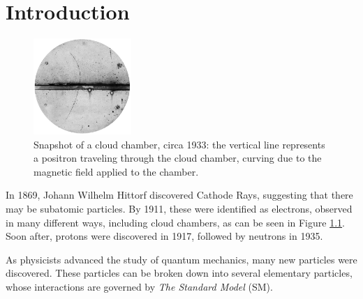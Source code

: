 \chapter{Introduction}\label{Sec:Intro}
\begin{figure}[h]
    \centering
        \includegraphics[width=0.33\textwidth]{F1/Cloud}
        \caption{Snapshot of a cloud chamber, circa 1933: the vertical line represents a positron traveling through the cloud chamber, curving due to the magnetic field applied to the chamber.}
        \label{Fig:Intro:Elec}
\end{figure}

In 1869, Johann Wilhelm Hittorf discovered Cathode Rays\cite{cathode}, suggesting that there may be subatomic particles. By 1911, these were identified as electrons, observed in many different ways, including cloud chambers, as can be seen in Figure \ref{Fig:Intro:Elec}. Soon after, protons were discovered in 1917, followed by neutrons in 1935.

As physicists advanced the study of quantum mechanics, many new particles were discovered. These particles can be broken down into several elementary particles, whose interactions are governed by \textit{The Standard Model} (SM).

